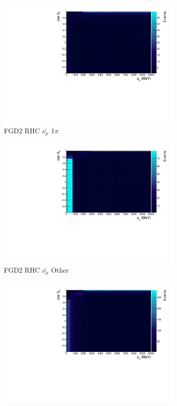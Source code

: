 \begin{figure}
\begin{subfigure}{.32\textwidth}
  \includegraphics[width=0.95\linewidth]{figs/TH2D_MC_FGD2_anti-numuCC_1pi}
  \caption{FGD2 RHC $\bar{\nu_{\mu}}$ 1$\pi$}
  \label{fig:th2dth2dFGD2_anti-numuCC_1pi}
\end{subfigure}
\begin{subfigure}{.32\textwidth}
  \centering
  \includegraphics[width=0.95\linewidth]{figs/TH2D_MC_FGD2_anti-numuCC_other}
  \caption{FGD2 RHC $\bar{\nu_{\mu}}$ Other}
  \label{fig:th2dFGD2_anti-numuCC_other}
\end{subfigure}
\begin{subfigure}{.32\textwidth}
  \centering
  \includegraphics[width=0.95\linewidth]{figs/TH2D_MC_FGD1_NuMuBkg_CC0pi_in_AntiNu_Mode}

\end{subfigure}
\end{figure}
